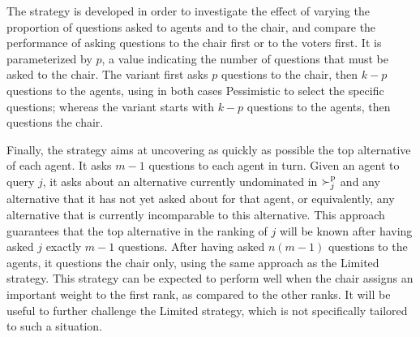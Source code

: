 \documentclass[sigconf, anonymous]{aamas}
\begin{document}
The  strategy is developed in order to investigate the effect of varying the proportion of questions asked to agents and to the chair, and compare the performance of asking questions to the chair first or to the voters first. It is parameterized by $p$, a value indicating the number of questions that must be asked to the chair.
The  variant first asks $p$ questions to the chair, then $k-p$ questions to the agents, using in both cases Pessimistic to select the specific questions; whereas the  variant starts with $k - p$ questions to the agents, then questions the chair. 

Finally, the  strategy aims at uncovering as quickly as possible the top alternative of each agent. It asks $m-1$ questions to each agent in turn. 
Given an agent to query $j$, it asks about an alternative currently undominated in $\succ^\text{p}_j$ and any alternative that it has not yet asked about for that agent, or equivalently, any alternative that is currently incomparable to this alternative. This approach guarantees that the top alternative in the ranking of $j$ will be known after having asked $j$ exactly $m-1$ questions.
After having asked $n (m-1)$ questions to the agents, it questions the chair only, using the same approach as the Limited strategy.
This strategy can be expected to perform well when the chair assigns an important weight to the first rank, as compared to the other ranks. It will be useful to further challenge the Limited strategy, which is not specifically tailored to such a situation.

\end{document}
